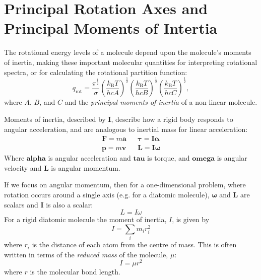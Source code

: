\documentclass[a4paper]{article}
\newcommand{\bvec}[1]{\boldsymbol{\mathbf{#1}}}
\begin{document}
\section{Principal Rotation Axes and Principal Moments of Intertia}
The rotational energy levels of a molecule depend upon the molecule's moments of inertia, making these important molecular quantities for interpreting rotational spectra, or for calculating the rotational partition function:
\begin{equation}
q_\mathrm{rot} = \frac{\pi^{\frac{1}{2}}}{\sigma}\left(\frac{k_\mathrm{B}T}{hcA}\right)^\frac{1}{2}\left(\frac{k_\mathrm{B}T}{hcB}\right)^\frac{1}{2}\left(\frac{k_\mathrm{B}T}{hcC}\right)^\frac{1}{2},
\end{equation}
where $A$, $B$, and $C$ and the \emph{principal moments of inertia} of a non-linear molecule.

Moments of inertia, described by $\bvec{I}$, describe how a rigid body responds to angular acceleration, and are analogous to inertial mass for linear acceleration:
\begin{align*}
\bvec{F} = m\bvec{a} && \bvec{\tau} = \bvec{I} \bvec{\alpha} \\
\bvec{p} = m\bvec{v} && \bvec{L}    = \bvec{I}\bvec{\omega} 
\end{align*}
Where $\bvec{alpha}$ is angular acceleration and $\bvec{tau}$ is torque, and $\bvec{omega}$ is angular velocity and $\bvec{L}$ is angular momentum.

If we focus on angular momentum, then for a one-dimensional problem, where rotation occurs around a single axis (e.g. for a diatomic molecule), $\bvec{\omega}$ and $\bvec{L}$ are scalars and $\bvec{I}$ is also a scalar:
\begin{equation*}
L = I\omega
\end{equation*}
For a rigid diatomic molecule the moment of inertia, $I$, is given by
\begin{equation*}
I = \sum_i m_i r_i^2
\end{equation*}
where $r_i$ is the distance of each atom from the centre of mass. This is often written in terms of the \emph{reduced mass} of the molecule, $\mu$:
\begin{equation*}
I = \mu r^2
\end{equation*}
where $r$ is the molecular bond length.
\end{document}
